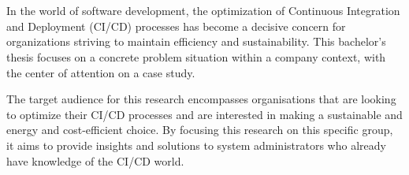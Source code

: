 
\chapter{}%
\label{ch:inleiding}

\section{}%
\label{sec:probleemstelling}

In the world of software development, the optimization of Continuous Integration and Deployment (CI/CD) processes has become a decisive concern for organizations striving to maintain efficiency and sustainability.
This bachelor's thesis focuses on a concrete problem situation within a company context, with the center of attention on a case study.

The target audience for this research encompasses organisations that are looking to optimize their CI/CD processes and are interested in making a sustainable and energy and cost-efficient choice.
By focusing this research on this specific group, it aims to provide insights and solutions to system administrators who already have knowledge of the CI/CD world.


\section{}%
\label{sec:onderzoeksvraag}

